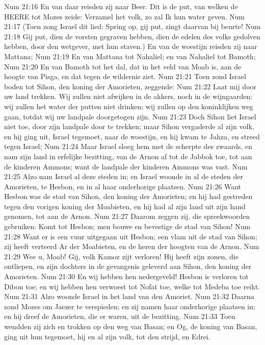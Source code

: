 Num 21:16  En van daar reisden zij naar Beer. Dit is de put, van welken de HEERE tot Mozes zeide: Verzamel het volk, zo zal Ik hun water geven.
Num 21:17  (Toen zong Israel dit lied: Spring op, gij put, zingt daarvan bij beurte!
Num 21:18  Gij put, dien de vorsten gegraven hebben, dien de edelen des volks gedolven hebben, door den wetgever, met hun staven.) En van de woestijn reisden zij naar Mattana;
Num 21:19  En van Mattana tot Nahaliel; en van Nahaliel tot Bamoth;
Num 21:20  En van Bamoth tot het dal, dat in het veld van Moab is, aan de hoogte van Pisga, en dat tegen de wildernis ziet.
Num 21:21  Toen zond Israel boden tot Sihon, den koning der Amorieten, zeggende:
Num 21:22  Laat mij door uw land trekken. Wij zullen niet afwijken in de akkers, noch in de wijngaarden; wij zullen het water der putten niet drinken; wij zullen op den koninklijken weg gaan, totdat wij uw landpale doorgetogen zijn.
Num 21:23  Doch Sihon liet Israel niet toe, door zijn landpale door te trekken; maar Sihon vergaderde al zijn volk, en hij ging uit, Israel tegemoet, naar de woestijn, en hij kwam te Jahza, en streed tegen Israel;
Num 21:24  Maar Israel sloeg hem met de scherpte des zwaards, en nam zijn land in erfelijke bezitting, van de Arnon af tot de Jabbok toe, tot aan de kinderen Ammons; want de landpale der kinderen Ammons was vast.
Num 21:25  Alzo nam Israel al deze steden in; en Israel woonde in al de steden der Amorieten, te Hesbon, en in al haar onderhorige plaatsen.
Num 21:26  Want Hesbon was de stad van Sihon, den koning der Amorieten; en hij had gestreden tegen den vorigen koning der Moabieten, en hij had al zijn land uit zijn hand genomen, tot aan de Arnon.
Num 21:27  Daarom zeggen zij, die spreekwoorden gebruiken: Komt tot Hesbon; men bouwe en bevestige de stad van Sihon!
Num 21:28  Want er is een vuur uitgegaan uit Hesbon; een vlam uit de stad van Sihon; zij heeft verteerd Ar der Moabieten, en de heren der hoogten van de Arnon.
Num 21:29  Wee u, Moab! Gij, volk Kamoz zijt verloren! Hij heeft zijn zonen, die ontliepen, en zijn dochters in de gevangenis geleverd aan Sihon, den koning der Amorieten.
Num 21:30  En wij hebben hen nedergeveld! Hesbon is verloren tot Dibon toe; en wij hebben hen verwoest tot Nofat toe, welke tot Medeba toe reikt.
Num 21:31  Alzo woonde Israel in het land van den Amoriet.
Num 21:32  Daarna zond Mozes om Jaezer te verspieden; en zij namen haar onderhorige plaatsen in; en hij dreef de Amorieten, die er waren, uit de bezitting.
Num 21:33  Toen wendden zij zich en trokken op den weg van Basan; en Og, de koning van Basan, ging uit hun tegemoet, hij en al zijn volk, tot den strijd, en Edrei.
